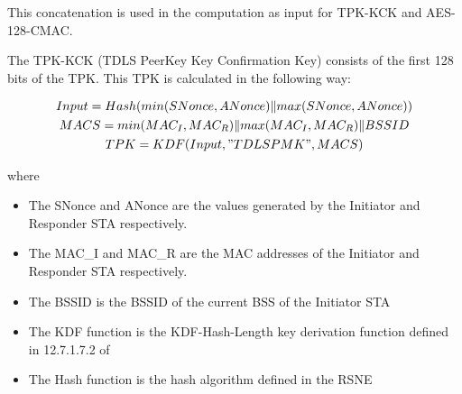 This concatenation is used in the computation as input for TPK-KCK and AES-128-CMAC.

The TPK-KCK (TDLS PeerKey Key Confirmation Key) consists of the first 128 bits of the TPK.
This TPK is calculated in the following way:

\begin{gather}
Input = Hash(min(SNonce, ANonce) \| max(SNonce, ANonce))\\
MACS = min(MAC_I, MAC_R) \| max (MAC_I, MAC_R) \| BSSID\\
TPK = KDF(Input, "TDLS PMK", MACS)
\end{gather}

where

\begin{itemize}
	\item The SNonce and ANonce are the values generated by the Initiator and Responder STA respectively.
	\item The MAC_I and MAC_R are the MAC addresses of the Initiator and Responder STA respectively.
	\item The BSSID is the BSSID of the current BSS of the Initiator STA
	\item The KDF function is the KDF-Hash-Length key derivation function defined in 12.7.1.7.2 of \cite{ieee80211}
	\item The Hash function is the hash algorithm defined in the RSNE
\end{itemize}

\fi